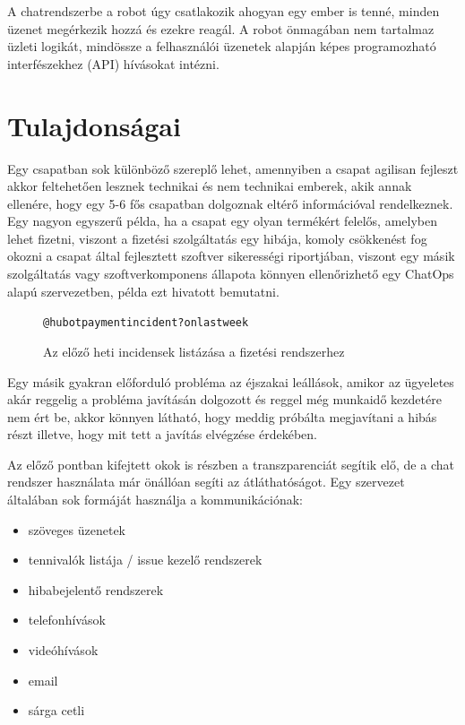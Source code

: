 A chatrendszerbe a robot úgy csatlakozik ahogyan egy ember is tenné, minden üzenet megérkezik hozzá és ezekre reagál. A robot önmagában nem tartalmaz üzleti logikát, mindössze a felhasználói üzenetek alapján képes programozható interfészekhez (API) hívásokat intézni.

\section{Tulajdonságai}

\label{subsection:better_communication}
Egy csapatban sok különböző szereplő lehet, amennyiben a csapat agilisan fejleszt akkor feltehetően lesznek technikai és nem technikai emberek, akik annak ellenére, hogy egy 5-6 fős csapatban dolgoznak eltérő információval rendelkeznek. Egy nagyon egyszerű példa, ha a csapat egy olyan termékért felelős, amelyben lehet fizetni, viszont a fizetési szolgáltatás egy hibája, komoly csökkenést fog okozni a csapat által fejlesztett szoftver sikerességi riportjában, viszont egy másik szolgáltatás vagy szoftverkomponens állapota könnyen ellenőrizhető egy ChatOps alapú szervezetben,  példa ezt hivatott bemutatni.

\begin{figure}
    \begin{alltt}
@hubot payment incident? on last week
    \end{alltt}
    \caption[DUMMY]%
    {Az előző heti incidensek listázása a fizetési rendszerhez}%
    \label{fig:get_outage_for_payment}
\end{figure}

Egy másik gyakran előforduló probléma az éjszakai leállások, amikor az ügyeletes akár reggelig a probléma javításán dolgozott és reggel még munkaidő kezdetére nem ért be, akkor könnyen látható, hogy meddig próbálta megjavítani a hibás részt illetve, hogy mit tett a javítás elvégzése érdekében.


Az előző pontban kifejtett okok is részben a transzparenciát segítik elő, de a chat rendszer használata már önállóan segíti az átláthatóságot.
Egy szervezet általában sok formáját használja a kommunikációnak:

\begin{itemize}
  \item szöveges üzenetek
  \item tennivalók listája / issue kezelő rendszerek
  \item hibabejelentő rendszerek
  \item telefonhívások
  \item videóhívások
  \item email
  \item sárga cetli
\end{itemize}


